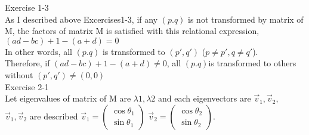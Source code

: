 \documentclass[11pt, oneside]{article}   	%
\begin{document}
Exercise 1-3\\
As I described above  Excercises1-3,  if any $(p.q)$ is not transformed by matrix of M, the factors of matrix M is satisfied with this  relational expression,\\  $(ad-bc)+1-(a+d)=0$\\
In other words, all $(p.q)$ is transformed to $(p',q')$ ($p\neq p', q\neq q'$).\\
Therefore, if $(ad-bc)+1-(a+d) \neq 0$, all $(p.q)$is transformed to others without $(p',q')\neq (0,0)$
\\



Exercise 2-1\\
Let eigenvalues of matrix of M are $\lambda 1, \lambda 2$ and each eigenvectors are $\vec v_1, \vec v_2$,\\
$\vec v_1, \vec v_2$ are described 
$ \vec v_1=
\begin{pmatrix}
 \cos {\theta_1}\\
 \sin {\theta_1} 
\end{pmatrix}$
$ \vec v_2=
\begin{pmatrix}
 \cos {\theta_2}\\
 \sin {\theta_2} 
\end{pmatrix}$.\\
\end{document}
